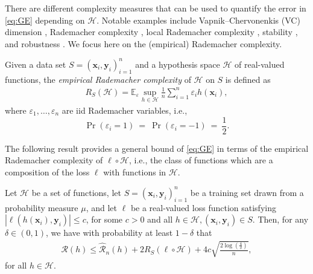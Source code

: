 \documentclass{svproc}
\newcommand{\corr}[1]{#1}
\newcommand{\bx}{\boldsymbol{x}}
\newcommand{\by}{\boldsymbol{y}}
\newcommand{\0}{\boldsymbol{0}}
\newcommand{\1}{\boldsymbol{1}}
\newcommand{\calH}{\mathcal{H}}
\newcommand{\calR}{\mathcal{R}}
\renewcommand{\hat}{\widehat}
\def\E{\mathbb{E}}
\def\calH{\mathcal{H}}
\def\calR{\mathcal{R}}
\begin{document}
There are different complexity measures that can be used to quantify the error in \eqref{eq:GE} depending on $\calH$. Notable examples include \corr{Vapnik--Chervonenkis} (VC) dimension \cite{vapnik2015uniform}, Rademacher complexity \cite{koltchinskii2002rademacher,bartlett2002rademacher}, local Rademacher complexity \cite{babome05}, stability \cite{shalev2010learnability,rakhlin2005stability}\corr{,} and robustness \cite{xu2012robustness}. We focus here on the (empirical) Rademacher complexity.

\begin{definition}
    Given a data set $S = (\bx_i,\by_i)_{i=1}^n$ and a hypothesis space $\calH$ of real-valued functions, the \emph{empirical Rademacher complexity} of $\calH$ on $S$ is defined as
    \begin{align*}
        R_S(\calH) = \E_\varepsilon \sup_{h \in \calH} \frac{1}{n} \sum_{i=1}^n \varepsilon_i h(\bx_i),
    \end{align*}
    where $\varepsilon_1,\dots,\varepsilon_n$ are iid Rademacher variables, i.e., $$\Pr(\varepsilon_i = 1)~=~\Pr(\varepsilon_i = -1)~=~\frac{1}{2}.$$
\end{definition}

The following result provides a general bound of \eqref{eq:GE} in terms of the empirical Rademacher complexity of $\ell \circ \calH$, i.e., the class of functions which are a composition of the loss $\ell$ with functions in $\calH$.

\begin{theorem}
\label{thm:Generalization_General}
    Let $\calH$ be a set of functions, let $S = (\bx_i,\by_i)_{i=1}^n$ be a training set drawn from a probability measure $\mu$, and let $\ell$ be a real-valued loss function satisfying $|\ell(h(\bx_i),\by_i)| \le c$, for some $c > 0$ and all $h \in \calH, (\bx_i,\by_i) \in S$. Then, for any $\delta \in (0,1)$, we have with probability at least $1-\delta$ that
    \begin{align*}
        \calR(h) \le \hat{\calR}_n(h) + 2 R_S(\ell \circ \calH) + 4c \sqrt{\frac{2 \log(\frac{4}{\delta})}{n}},
    \end{align*}
    for all $h \in \calH$.
\end{theorem}
\end{document}
